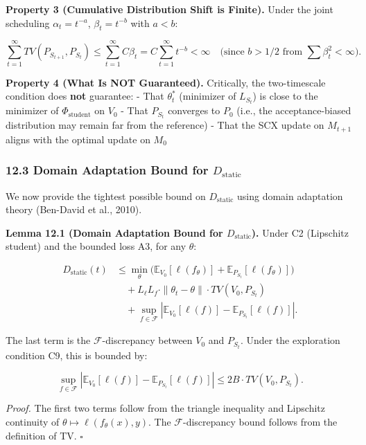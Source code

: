 \documentclass[
  12pt,
]{article}
\begin{document}
\textbf{Property 3 (Cumulative Distribution Shift is Finite).} Under the
joint scheduling \(\alpha_t = t^{-a}\), \(\beta_t = t^{-b}\) with
\(a < b\):

\[\sum_{t=1}^\infty TV(P_{S_{t+1}}, P_{S_t}) \leq \sum_{t=1}^\infty C \beta_t = C \sum_{t=1}^\infty t^{-b} < \infty \quad \text{(since } b > 1/2 \text{ from } \sum \beta_t^2 < \infty\text{).}\]

\textbf{Property 4 (What Is NOT Guaranteed).} Critically, the
two-timescale condition does \textbf{not} guarantee: - That
\(\theta_t^*\) (minimizer of \(L_{S_t}\)) is close to the minimizer of
\(\Phi_{\text{student}}\) on \(V_0\) - That \(P_{S_t}\) converges to
\(P_0\) (i.e., the acceptance-biased distribution may remain far from
the reference) - That the SCX update on \(M_{t+1}\) aligns with the
optimal update on \(M_0\)

\subsubsection{\texorpdfstring{12.3 Domain Adaptation Bound for
\(D_{\text{static}}\)}{12.3 Domain Adaptation Bound for D\_\{\textbackslash text\{static\}\}}}\label{domain-adaptation-bound-for-d_textstatic}

We now provide the tightest possible bound on \(D_{\text{static}}\)
using domain adaptation theory (Ben-David et al., 2010).

\textbf{Lemma 12.1 (Domain Adaptation Bound for \(D_{\text{static}}\)).}
Under C2 (Lipschitz student) and the bounded loss A3, for any
\(\theta\):

\[\begin{aligned}
D_{\text{static}}(t) &\leq \min_{\theta} \bigl(\mathbb{E}_{V_0}[\ell(f_\theta)] + \mathbb{E}_{P_{S_t}}[\ell(f_\theta)]\bigr) \\
&\quad + L_\ell L_f \cdot \|\theta_t - \theta\| \cdot TV(V_0, P_{S_t}) \\
&\quad + \sup_{f \in \mathcal{F}} |\mathbb{E}_{V_0}[\ell(f)] - \mathbb{E}_{P_{S_t}}[\ell(f)]|.
\end{aligned}\]

The last term is the \(\mathcal{F}\)-discrepancy between \(V_0\) and
\(P_{S_t}\). Under the exploration condition C9, this is bounded by:

\[\sup_{f \in \mathcal{F}} |\mathbb{E}_{V_0}[\ell(f)] - \mathbb{E}_{P_{S_t}}[\ell(f)]| \leq 2B \cdot TV(V_0, P_{S_t}).\]

\emph{Proof.} The first two terms follow from the triangle inequality
and Lipschitz continuity of \(\theta \mapsto \ell(f_\theta(x), y)\). The
\(\mathcal{F}\)-discrepancy bound follows from the definition of TV.
\(\square\)
\end{document}
